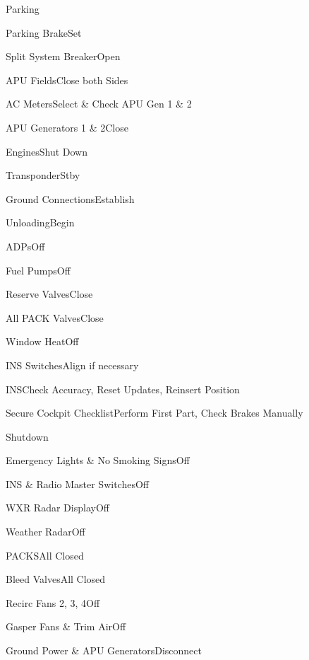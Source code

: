 \documentclass[sim-use]{checklist}
\begin{document}
\begin{checklist}{Parking}
	\item{Parking Brake}{Set}
	\item{Split System Breaker}{Open}
	\item{APU Fields}{Close both Sides}
	\item{AC Meters}{Select \& Check APU Gen 1 \& 2}
	\item{APU Generators 1 \& 2}{Close}
	\item{Engines}{Shut Down}
	\item{Transponder}{Stby}
	\item{Ground Connections}{Establish}
	\item{Unloading}{Begin}
	\item{ADPs}{Off}
	\item{Fuel Pumps}{Off}
	\item{Reserve Valves}{Close}
	 {
		\item{All PACK Valves}{Close}
	}
	\item{Window Heat}{Off}
	\item{INS Switches}{Align if necessary}
	\item{INS}{Check Accuracy, Reset Updates, Reinsert Position}
	\item{Secure Cockpit Checklist}{Perform First Part, Check Brakes Manually}
\end{checklist}

\begin{checklist}{Shutdown}
	\item{Emergency Lights \& No Smoking Signs}{Off}
	\item{INS \& Radio Master Switches}{Off}
	\item{WXR Radar Display}{Off}
	\item{Weather Radar}{Off}
	\item{PACKS}{All Closed}
	\item{Bleed Valves}{All Closed}
	\item{Recirc Fans 2, 3, 4}{Off}
	\item{Gasper Fans \& Trim Air}{Off}
	\item{Ground Power \& APU Generators}{Disconnect}
\end{checklist}
\end{document}
